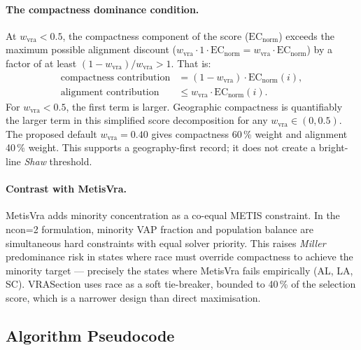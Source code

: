 \paragraph{The compactness dominance condition.}
At $w_\text{vra} < 0.5$, the compactness component of the score
($\mathrm{EC}_\text{norm}$) exceeds the maximum possible alignment discount
($w_\text{vra} \cdot 1 \cdot \mathrm{EC}_\text{norm} = w_\text{vra} \cdot \mathrm{EC}_\text{norm}$)
by a factor of at least $(1 - w_\text{vra}) / w_\text{vra} > 1$.
That is:
\begin{align*}
  \text{compactness contribution}
    &= (1 - w_\text{vra}) \cdot \mathrm{EC}_\text{norm}(i),\\
  \text{alignment contribution}
    &\leq w_\text{vra} \cdot \mathrm{EC}_\text{norm}(i).
\end{align*}
For $w_\text{vra} < 0.5$, the first term is larger.
Geographic compactness is quantifiably the larger term in this simplified
score decomposition for any $w_\text{vra} \in (0, 0.5)$.
The proposed default $w_\text{vra} = 0.40$ gives compactness 60\,\% weight
and alignment 40\,\% weight.  This supports a geography-first record; it does
not create a bright-line \emph{Shaw} threshold.

\paragraph{Contrast with MetisVra.}
MetisVra adds minority concentration as a co-equal METIS constraint.
In the ncon=2 formulation, minority VAP fraction and population balance
are simultaneous hard constraints with equal solver priority.
This raises \emph{Miller} predominance risk in states where race
must override compactness to achieve the minority target --- precisely
the states where MetisVra fails empirically (AL, LA, SC).
VRASection uses race as a soft tie-breaker, bounded to 40\,\% of the
selection score, which is a narrower design than direct maximisation.

\subsection{Algorithm Pseudocode}

